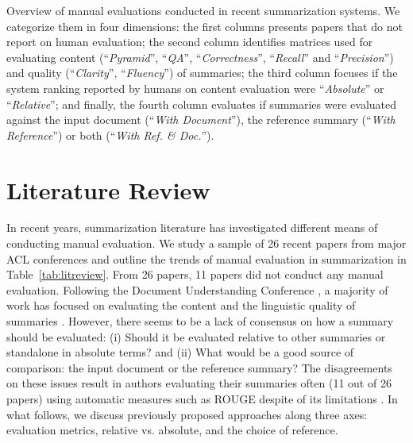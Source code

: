 \documentclass[11pt,a4paper]{article}
\begin{document}
\begin{table}[t!]
\caption{Overview of manual evaluations conducted in recent summarization systems. We categorize them in four dimensions: the first columns presents papers that do not report on human evaluation; the second column identifies matrices used for evaluating content (``\textit{Pyramid}'', ``\textit{QA}'', ``\textit{Correctness}'', ``\textit{Recall}'' and ``\textit{Precision}'') and quality (``\textit{Clarity}'', ``\textit{Fluency}'') of summaries; the third column focuses if the system ranking reported by humans on content evaluation were ``\textit{Absolute}'' or ``\textit{Relative}''; and finally, the fourth column evaluates if summaries were evaluated against the input document (``\textit{With Document}''), the reference summary (``\textit{With Reference}'') or both (``\textit{With Ref. \& Doc.}'').}
\label{tab:litreview}
\end{table}

\section{Literature Review}
\label{sec:review}

In recent years, summarization literature has investigated different means of conducting manual evaluation. We study a sample of 26 recent papers from major ACL conferences and outline the trends of manual evaluation in summarization in Table~\ref{tab:litreview}. From 26 papers, 11 papers \citep[e.g.,][]{See2017,Kedzie2018,Cao2018a} did not conduct any manual evaluation.
Following the Document Understanding Conference \citep[DUC, ][]{dang2005overview}, a majority of work has focused on evaluating the content and the linguistic quality of summaries \cite{Nenkova:2005:ATS}. However, there seems to be a lack of consensus on how a summary should be evaluated: (i) Should it be evaluated relative to other summaries or standalone in absolute terms? and (ii) What would be a good source of comparison: the input document or the reference summary? The disagreements on these issues result in authors evaluating their summaries often (11 out of 26 papers) using automatic measures such as ROUGE \cite{Lin2004} despite of its limitations \cite{schluter:2017:EACLshort}. 
In what follows, we discuss previously proposed %
approaches along three axes: evaluation metrics, relative vs. absolute, and the choice of reference.
\end{document}
